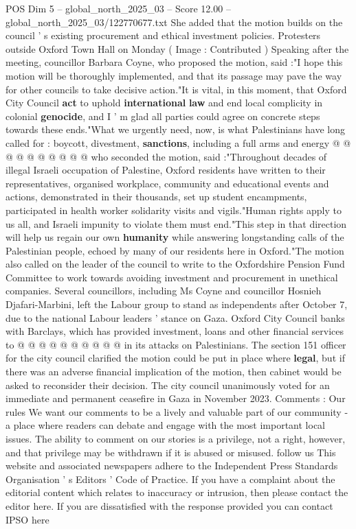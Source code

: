\begin{textsample}{POS Dim 5 – global\_north\_2025\_03 – Score 12.00 – global\_north\_2025\_03/122770677.txt}
She added that the motion builds on the council ' s existing procurement and ethical investment policies.
Protesters outside Oxford Town Hall on Monday ( Image : Contributed ) Speaking after the meeting, councillor Barbara Coyne, who proposed the motion, said :"I hope this motion will be thoroughly implemented, and that its passage may pave the way for other councils to take decisive action."It is vital, in this moment, that Oxford City Council \textbf{act} to uphold \textbf{international} \textbf{law} and end local complicity in colonial \textbf{genocide}, and I ' m glad all parties could agree on concrete steps towards these ends."What we urgently need, now, is what Palestinians have long called for : boycott, divestment, \textbf{sanctions}, including a full arms and energy @ @ @ @ @ @ @ @ @ @ who seconded the motion, said :"Throughout decades of illegal Israeli occupation of Palestine, Oxford residents have written to their representatives, organised workplace, community and educational events and actions, demonstrated in their thousands, set up student encampments, participated in health worker solidarity visits and vigils."Human rights apply to us all, and Israeli impunity to violate them must end."This step in that direction will help us regain our own \textbf{humanity} while answering longstanding calls of the Palestinian people, echoed by many of our residents here in Oxford."The motion also called on the leader of the council to write to the Oxfordshire Pension Fund Committee to work towards avoiding investment and procurement in unethical companies.
Several councillors, including Ms Coyne and councillor Hosnieh Djafari-Marbini, left the Labour group to stand as independents after October 7, due to the national Labour leaders ' stance on Gaza.
Oxford City Council banks with Barclays, which has provided investment, loans and other financial services to @ @ @ @ @ @ @ @ @ @ in its attacks on Palestinians.
The section 151 officer for the city council clarified the motion could be put in place where \textbf{legal}, but if there was an adverse financial implication of the motion, then cabinet would be asked to reconsider their decision.
The city council unanimously voted for an immediate and permanent ceasefire in Gaza in November 2023.
Comments : Our rules We want our comments to be a lively and valuable part of our community - a place where readers can debate and engage with the most important local issues.
The ability to comment on our stories is a privilege, not a right, however, and that privilege may be withdrawn if it is abused or misused. follow us This website and associated newspapers adhere to the Independent Press Standards Organisation ' s Editors ' Code of Practice.
If you have a complaint about the editorial content which relates to inaccuracy or intrusion, then please contact the editor here.
If you are dissatisfied with the response provided you can contact IPSO here

\end{textsample}
